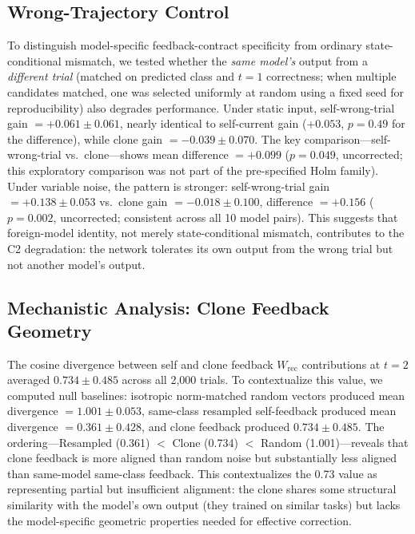 \documentclass[10pt]{article}
\begin{document}
\subsection{Wrong-Trajectory Control}
\label{sec:wrong_trajectory}

To distinguish model-specific feedback-contract specificity from ordinary state-conditional mismatch, we tested whether the \emph{same model's} output from a \emph{different trial} (matched on predicted class and $t{=}1$ correctness; when multiple candidates matched, one was selected uniformly at random using a fixed seed for reproducibility) also degrades performance. Under static input, self-wrong-trial gain $= +0.061 \pm 0.061$, nearly identical to self-current gain ($+0.053$, $p = 0.49$ for the difference), while clone gain $= -0.039 \pm 0.070$. The key comparison---self-wrong-trial vs.\ clone---shows mean difference $= +0.099$ ($p = 0.049$, uncorrected; this exploratory comparison was not part of the pre-specified Holm family). Under variable noise, the pattern is stronger: self-wrong-trial gain $= +0.138 \pm 0.053$ vs.\ clone gain $= -0.018 \pm 0.100$, difference $= +0.156$ ($p = 0.002$, uncorrected; consistent across all 10 model pairs). This suggests that foreign-model identity, not merely state-conditional mismatch, contributes to the C2 degradation: the network tolerates its own output from the wrong trial but not another model's output.

\subsection{Mechanistic Analysis: Clone Feedback Geometry}
\label{sec:geometry_results}

The cosine divergence between self and clone feedback $W_\text{rec}$ contributions at $t{=}2$ averaged $0.734 \pm 0.485$ across all 2,000 trials. To contextualize this value, we computed null baselines: isotropic norm-matched random vectors produced mean divergence $= 1.001 \pm 0.053$, same-class resampled self-feedback produced mean divergence $= 0.361 \pm 0.428$, and clone feedback produced $0.734 \pm 0.485$. The ordering---Resampled (0.361) $<$ Clone (0.734) $<$ Random (1.001)---reveals that clone feedback is more aligned than random noise but substantially less aligned than same-model same-class feedback. This contextualizes the 0.73 value as representing partial but insufficient alignment: the clone shares some structural similarity with the model's own output (they trained on similar tasks) but lacks the model-specific geometric properties needed for effective correction.
\end{document}
